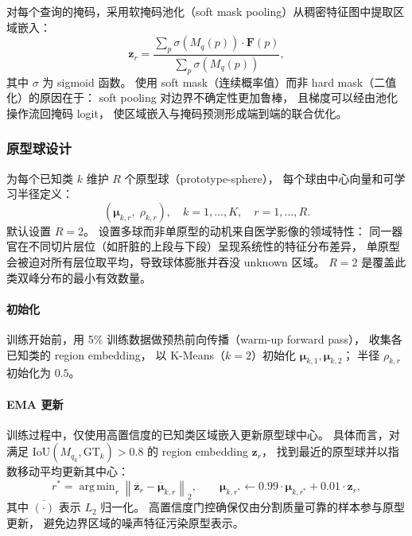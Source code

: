 \documentclass[3p,twocolumn,authoryear]{elsarticle}
\newcommand{\bF}{\mathbf{F}}                              %
\newcommand{\bz}{\mathbf{z}}                              %
\newcommand{\bmu}{\boldsymbol{\mu}}                       %
\DeclareMathOperator*{\argmin}{arg\,min}
\begin{document}
对每个查询的掩码，采用软掩码池化（soft mask pooling）从稠密特征图中提取区域嵌入：
\begin{equation}\label{eq:mask_pool}
  \bz_r = \frac{\sum_{p} \sigma\!\left(M_q(p)\right) \cdot \bF(p)}{\sum_{p} \sigma\!\left(M_q(p)\right)},
\end{equation}
其中 $\sigma$ 为 sigmoid 函数。
使用 soft mask（连续概率值）而非 hard mask（二值化）的原因在于：
soft pooling 对边界不确定性更加鲁棒，
且梯度可以经由池化操作流回掩码 logit，
使区域嵌入与掩码预测形成端到端的联合优化。

\subsubsection{原型球设计}\label{sec:method:support:sphere}

为每个已知类 $k$ 维护 $R$ 个原型球（prototype-sphere），
每个球由中心向量和可学习半径定义：
\begin{equation}\label{eq:proto_sphere}
  (\bmu_{k,r},\; \rho_{k,r}), \quad k = 1, \ldots, K, \quad r = 1, \ldots, R.
\end{equation}
默认设置 $R=2$。
设置多球而非单原型的动机来自医学影像的领域特性：
同一器官在不同切片层位（如肝脏的上段与下段）呈现系统性的特征分布差异，
单原型会被迫对所有层位取平均，导致球体膨胀并吞没 unknown 区域。
$R=2$ 是覆盖此类双峰分布的最小有效数量。

\paragraph{初始化}
训练开始前，用 5\% 训练数据做预热前向传播（warm-up forward pass），
收集各已知类的 region embedding，
以 K-Means（$k=2$）初始化 $\bmu_{k,1}, \bmu_{k,2}$；
半径 $\rho_{k,r}$ 初始化为 $0.5$。

\paragraph{EMA 更新}
训练过程中，仅使用高置信度的已知类区域嵌入更新原型球中心。
具体而言，对满足 $\text{IoU}(M_{q_k}, \text{GT}_k) > 0.8$ 的 region embedding $\bz_r$，
找到最近的原型球并以指数移动平均更新其中心：
\begin{equation}\label{eq:ema}
  r^* = \argmin_{r} \left\|\overline{\bz}_r - \overline{\bmu}_{k,r}\right\|_2, \qquad
  \bmu_{k,r^*} \leftarrow 0.99 \cdot \bmu_{k,r^*} + 0.01 \cdot \bz_r,
\end{equation}
其中 $\overline{(\cdot)}$ 表示 $L_2$ 归一化。
高置信度门控确保仅由分割质量可靠的样本参与原型更新，
避免边界区域的噪声特征污染原型表示。
\end{document}
